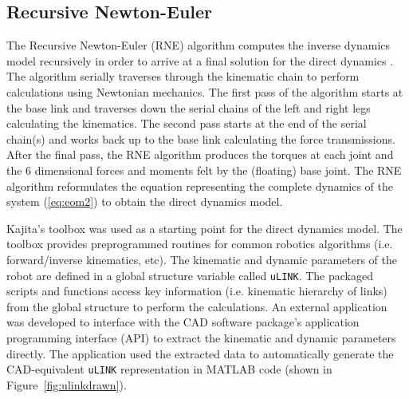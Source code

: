 \subsection{Recursive Newton-Euler} %
\label{sec:kajita_s_matlab_toolbox}

The Recursive Newton-Euler (RNE) algorithm computes the inverse dynamics model recursively in order to arrive at a final solution for the direct dynamics \cite{Perrin:1997wn}. The algorithm serially traverses through the kinematic chain to perform calculations using Newtonian mechanics. The first pass of the algorithm starts at the base link and traverses down the serial chains of the left and right legs calculating the kinematics. The second pass starts at the end of the serial chain(s) and works back up to the base link calculating the force transmissions. After the final pass, the RNE algorithm produces the torques at each joint and the 6 dimensional forces and moments felt by the (floating) base joint. The RNE algorithm reformulates the equation representing the complete dynamics of the system (\ref{eq:eom2}) to obtain the direct dynamics model. 

Kajita's toolbox \cite{kajitatxt} was used as a starting point for the direct dynamics model. The toolbox provides preprogrammed routines for common robotics algorithms (i.e. forward/inverse kinematics, etc). The kinematic and dynamic parameters of the robot are defined in a global structure variable called \texttt{uLINK}. The packaged scripts and functions access key information (i.e. kinematic hierarchy of links) from the global structure to perform the calculations. An external application was developed to interface with the CAD software package's application programming interface (API) to extract the kinematic and dynamic parameters directly. The application used the extracted data to automatically generate the CAD-equivalent \texttt{uLINK} representation in MATLAB code (shown in Figure~\ref{fig:ulinkdrawn}).

